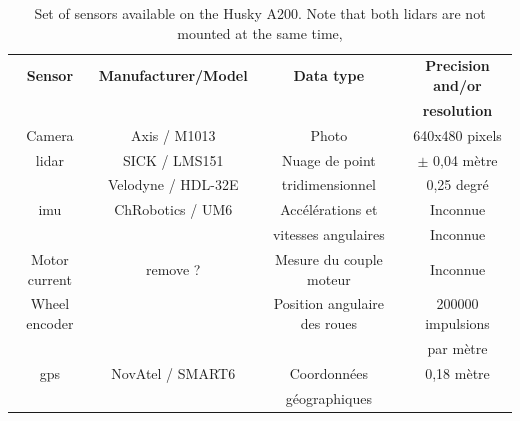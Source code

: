 \begin{table}[h]
    \centering
    \begin{tabular}{|c|c|c|c|}
        \hline
        \textbf{Sensor} & \textbf{Manufacturer/Model}       & \textbf{Data type}           & \textbf{Precision and/or} \\
                        &                                   &                              & \textbf{resolution}       \\ \hline
        Camera          & Axis / M1013                      & Photo                        & 640x480 pixels            \\ \hline
        \gls{lidar}     & SICK / LMS151                     & Nuage de point               & $\pm$ 0,04 mètre          \\
                        & Velodyne / HDL-32E                & tridimensionnel              & 0,25 degré                \\ \hline
        \gls{imu}       & ChRobotics / UM6                  & Accélérations et             & Inconnue                  \\
                        &                                   & vitesses angulaires          & Inconnue                  \\ \hline
        Motor current   & remove ?                          & Mesure du couple moteur      & Inconnue                  \\ \hline
        Wheel encoder   &                                   & Position angulaire des roues & 200000 impulsions         \\
                        &                                   &                              &  par mètre                \\ \hline
        \gls{gps}       & NovAtel / SMART6                  & Coordonnées                  & 0,18 mètre                \\
                        &                                   & géographiques                &                           \\ \hline
    \end{tabular}
    \caption{\label{tab:husky_sensors} Set of sensors available on the Husky A200. Note that both \gls{lidar}s are not mounted at the same time,}
    \label{tab:husky_sensors}
\end{table}

